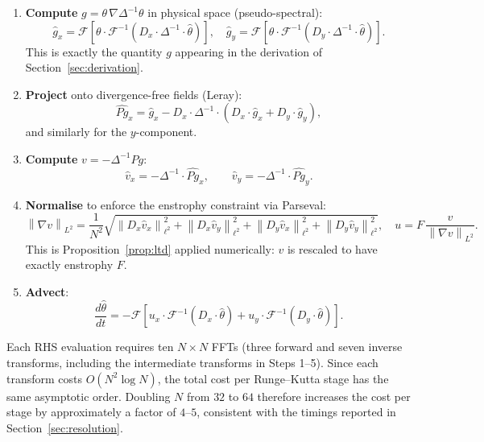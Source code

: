 \documentclass[12pt,a4paper]{article}
\newcommand{\norm}[1]{\left\lVert#1\right\rVert}
\newcommand{\lapinv}{\Delta^{-1}}
\newcommand{\Proj}{P}
\newcommand{\Dop}[1]{D_{#1}}
\theoremstyle{definition}
\theoremstyle{plain}
\begin{document}
\begin{enumerate}
  \item \textbf{Compute} $g = \theta\,\nabla\lapinv\theta$ in physical space
        (pseudo-spectral):
        \[
          \hat g_x = \mathcal{F}\!\left[\theta\cdot\mathcal{F}^{-1}
            (\Dop{x}\cdot\lapinv\cdot\hat\theta)\right],
          \quad
          \hat g_y = \mathcal{F}\!\left[\theta\cdot\mathcal{F}^{-1}
            (\Dop{y}\cdot\lapinv\cdot\hat\theta)\right].
        \]
        This is exactly the quantity $g$ appearing in the derivation of
        Section~\ref{sec:derivation}.

  \item \textbf{Project} onto divergence-free fields (Leray):
        \[
          \widehat{\Proj g}_x = \hat g_x
            - \Dop{x}\cdot\lapinv
              \cdot(\Dop{x}\cdot\hat g_x+\Dop{y}\cdot\hat g_y),
        \]
        and similarly for the $y$-component.

  \item \textbf{Compute} $v = -\lapinv\Proj g$:
        \[
          \hat v_x = -\lapinv\cdot\widehat{\Proj g}_x,\qquad
          \hat v_y = -\lapinv\cdot\widehat{\Proj g}_y.
        \]

  \item \textbf{Normalise} to enforce the enstrophy constraint via Parseval:
        \[
          \norm{\nabla v}_{L^2}
          = \frac{1}{N^2}\sqrt{
              \norm{\Dop{x}\hat v_x}_{\ell^2}^2
              +\norm{\Dop{x}\hat v_y}_{\ell^2}^2
              +\norm{\Dop{y}\hat v_x}_{\ell^2}^2
              +\norm{\Dop{y}\hat v_y}_{\ell^2}^2},
          \quad
          u = F\,\frac{v}{\norm{\nabla v}_{L^2}}.
        \]
        This is Proposition~\ref{prop:ltd} applied numerically: $v$ is
        rescaled to have exactly enstrophy $F$.

  \item \textbf{Advect}:
        \[
          \frac{d\hat\theta}{dt}
          = -\mathcal{F}\!\left[
              u_x\cdot\mathcal{F}^{-1}(\Dop{x}\cdot\hat\theta)
              + u_y\cdot\mathcal{F}^{-1}(\Dop{y}\cdot\hat\theta)
            \right].
        \]
\end{enumerate}

Each RHS evaluation requires ten $N\times N$ FFTs (three forward and seven
inverse transforms, including the intermediate transforms in Steps 1--5).
Since each transform costs $O(N^2\log N)$, the total cost per Runge--Kutta
stage has the same asymptotic order. Doubling $N$ from $32$ to $64$
therefore increases the cost per stage by approximately a factor of
$4$--$5$,
consistent with the timings reported in Section~\ref{sec:resolution}.
\end{document}
